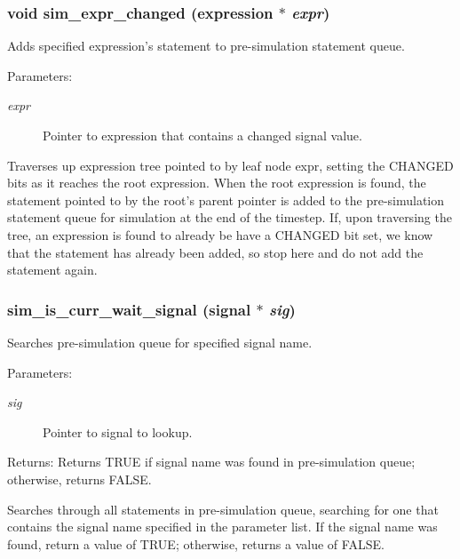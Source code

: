 \subsubsection{\setlength{\rightskip}{0pt plus 5cm}void sim\_\-expr\_\-changed ({\bf expression} $\ast$ {\em expr})}\label{sim_8h_a0}


Adds specified expression's statement to pre-simulation statement queue. 

\begin{Desc}
\item[Parameters:]
\begin{description}
\item[{\em expr}]Pointer to expression that contains a changed signal value.\end{description}
\end{Desc}
Traverses up expression tree pointed to by leaf node expr, setting the CHANGED bits as it reaches the root expression. When the root expression is found, the statement pointed to by the root's parent pointer is added to the pre-simulation statement queue for simulation at the end of the timestep. If, upon traversing the tree, an expression is found to already be have a CHANGED bit set, we know that the statement has already been added, so stop here and do not add the statement again. 
\subsubsection{ sim\_\-is\_\-curr\_\-wait\_\-signal ({\bf signal} $\ast$ {\em sig})}\label{sim_8h_a2}


Searches pre-simulation queue for specified signal name. 

\begin{Desc}
\item[Parameters:]
\begin{description}
\item[{\em sig}]Pointer to signal to lookup.\end{description}
\end{Desc}
\begin{Desc}
\item[Returns:]Returns TRUE if signal name was found in pre-simulation queue; otherwise, returns FALSE.\end{Desc}
Searches through all statements in pre-simulation queue, searching for one that contains the signal name specified in the parameter list. If the signal name was found, return a value of TRUE; otherwise, returns a value of FALSE. 
